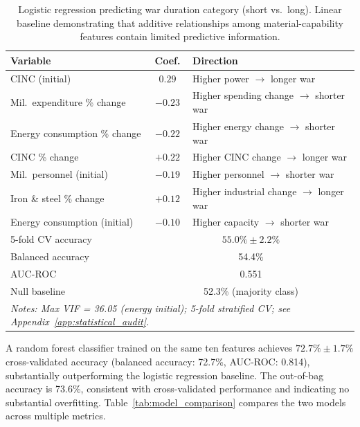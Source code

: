 \begin{table}[ht]
\centering
\caption{Logistic regression predicting war duration category (short vs.\ long). Linear baseline demonstrating that additive relationships among material-capability features contain limited predictive information.}
\label{tab:logistic}
\begin{tabularx}{\textwidth}{@{}l c X@{}}
\toprule
\textbf{Variable} & \textbf{Coef.} & \textbf{Direction} \\
\midrule
CINC (initial) & $0.29$ & Higher power $\rightarrow$ longer war \\
Mil.\ expenditure \% change & $-0.23$ & Higher spending change $\rightarrow$ shorter war \\
Energy consumption \% change & $-0.22$ & Higher energy change $\rightarrow$ shorter war \\
CINC \% change & $+0.22$ & Higher CINC change $\rightarrow$ longer war \\
Mil.\ personnel (initial) & $-0.19$ & Higher personnel $\rightarrow$ shorter war \\
Iron \& steel \% change & $+0.12$ & Higher industrial change $\rightarrow$ longer war \\
Energy consumption (initial) & $-0.10$ & Higher capacity $\rightarrow$ shorter war \\
\midrule
5-fold CV accuracy & \multicolumn{2}{c}{$55.0\% \pm 2.2\%$} \\
Balanced accuracy & \multicolumn{2}{c}{54.4\%} \\
AUC-ROC & \multicolumn{2}{c}{0.551} \\
Null baseline & \multicolumn{2}{c}{52.3\% (majority class)} \\
\multicolumn{3}{l}{\footnotesize\textit{Notes: Max VIF = 36.05 (energy initial); 5-fold stratified CV; see Appendix~\ref{app:statistical_audit}.}} \\
\bottomrule
\end{tabularx}
\end{table}

A random forest classifier trained on the same ten features achieves $72.7\% \pm 1.7\%$ cross-validated accuracy (balanced accuracy: 72.7\%, AUC-ROC: 0.814), substantially outperforming the logistic regression baseline. The out-of-bag accuracy is 73.6\%, consistent with cross-validated performance and indicating no substantial overfitting. Table~\ref{tab:model_comparison} compares the two models across multiple metrics.

